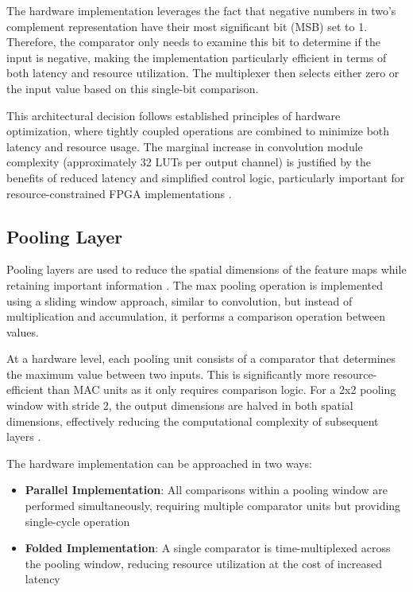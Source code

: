 The hardware implementation leverages the fact that negative numbers in two's complement representation have their most significant bit (MSB) set to 1. Therefore, the comparator only needs to examine this bit to determine if the input is negative, making the implementation particularly efficient in terms of both latency and resource utilization. The multiplexer then selects either zero or the input value based on this single-bit comparison.

This architectural decision follows established principles of hardware optimization, where tightly coupled operations are combined to minimize both latency and resource usage. The marginal increase in convolution module complexity (approximately 32 LUTs per output channel) is justified by the benefits of reduced latency and simplified control logic, particularly important for resource-constrained FPGA implementations \cite{16}.

\subsection{Pooling Layer}
\label{sec:pooling}

Pooling layers are used to reduce the spatial dimensions of the feature maps while retaining important information \cite{19}. The max pooling operation is implemented using a sliding window approach, similar to convolution, but instead of multiplication and accumulation, it performs a comparison operation between values.

At a hardware level, each pooling unit consists of a comparator that determines the maximum value between two inputs. This is significantly more resource-efficient than MAC units as it only requires comparison logic. For a 2x2 pooling window with stride 2, the output dimensions are halved in both spatial dimensions, effectively reducing the computational complexity of subsequent layers \cite{10}.

The hardware implementation can be approached in two ways:
\begin{itemize}
    \item \textbf{Parallel Implementation}: All comparisons within a pooling window are performed simultaneously, requiring multiple comparator units but providing single-cycle operation
    \item \textbf{Folded Implementation}: A single comparator is time-multiplexed across the pooling window, reducing resource utilization at the cost of increased latency
\end{itemize}


